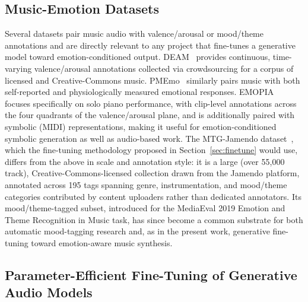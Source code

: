 \documentclass[11pt]{article}
\begin{document}
\subsection{Music-Emotion Datasets}
\label{sec:datasets}

Several datasets pair music audio with valence/arousal or mood/theme annotations and are directly relevant to any project that fine-tunes a generative model toward emotion-conditioned output. DEAM~\cite{aljanaki2017deam} provides continuous, time-varying valence/arousal annotations collected via crowdsourcing for a corpus of licensed and Creative-Commons music. PMEmo~\cite{zhang2018pmemo} similarly pairs music with both self-reported and physiologically measured emotional responses. EMOPIA~\cite{hung2021emopia} focuses specifically on solo piano performance, with clip-level annotations across the four quadrants of the valence/arousal plane, and is additionally paired with symbolic (MIDI) representations, making it useful for emotion-conditioned symbolic generation as well as audio-based work. The MTG-Jamendo dataset~\cite{bogdanov2019jamendo}, which the fine-tuning methodology proposed in Section~\ref{sec:finetune} would use, differs from the above in scale and annotation style: it is a large (over 55,000 track), Creative-Commons-licensed collection drawn from the Jamendo platform, annotated across 195 tags spanning genre, instrumentation, and mood/theme categories contributed by content uploaders rather than dedicated annotators. Its mood/theme-tagged subset, introduced for the MediaEval 2019 Emotion and Theme Recognition in Music task, has since become a common substrate for both automatic mood-tagging research and, as in the present work, generative fine-tuning toward emotion-aware music synthesis.

\subsection{Parameter-Efficient Fine-Tuning of Generative Audio Models}
\end{document}
